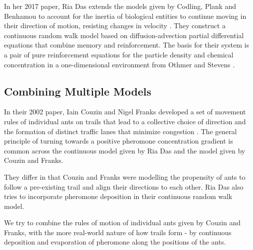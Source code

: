 In her 2017 paper, Ria Das extends the models given by Codling, Plank and Benhamou \cite{Codling2008} to account for the inertia of biological entities to continue moving in their direction of motion, resisting changes in velocity \cite{RiaDas2017}. They construct a continuous random walk model based on diffusion-advection partial differential equations that combine memory and reinforcement. The basis for their system  is a pair of pure reinforcement equations for the particle density and chemical concentration in a  one-dimensional environment from Othmer and Stevens \cite{Stevens1997}. 

\subsection{Combining Multiple Models}
In their 2002 paper, Iain Couzin and Nigel Franks developed a set of movement rules of individual ants on trails that lead to a collective choice of direction
and the formation of distinct traffic lanes that minimize congestion \cite{Couzin2003}. The general principle of turning towards a positive pheromone concentration gradient is common across the continuous model given by Ria Das and the model given by Couzin and Franks.

They differ in that Couzin and Franks were modelling the propensity of ants to follow a pre-existing trail and align their directions to each other. Ria Das also tries to incorporate pheromone deposition in their continuous random walk model.

We try to combine the rules of motion of individual ants given by Couzin and Franks, with the more real-world nature of how trails form - by continuous deposition and evaporation of pheromone along the positions of the ants.
